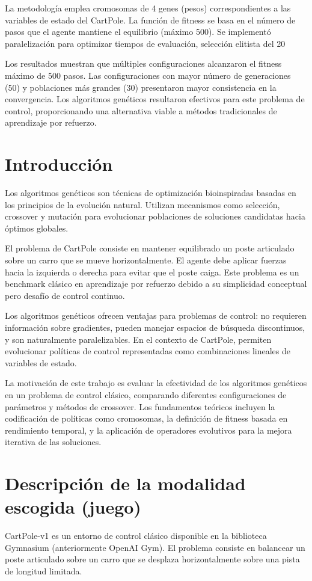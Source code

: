 \documentclass[12pt,a4paper]{article}
\begin{document}
La metodología emplea cromosomas de 4 genes (pesos) correspondientes a las variables de estado del CartPole. La función de fitness se basa en el número de pasos que el agente mantiene el equilibrio (máximo 500). Se implementó paralelización para optimizar tiempos de evaluación, selección elitista del 20%

Los resultados muestran que múltiples configuraciones alcanzaron el fitness máximo de 500 pasos. Las configuraciones con mayor número de generaciones (50) y poblaciones más grandes (30) presentaron mayor consistencia en la convergencia. Los algoritmos genéticos resultaron efectivos para este problema de control, proporcionando una alternativa viable a métodos tradicionales de aprendizaje por refuerzo.

\section{Introducción}

Los algoritmos genéticos son técnicas de optimización bioinspiradas basadas en los principios de la evolución natural. Utilizan mecanismos como selección, crossover y mutación para evolucionar poblaciones de soluciones candidatas hacia óptimos globales.

El problema de CartPole consiste en mantener equilibrado un poste articulado sobre un carro que se mueve horizontalmente. El agente debe aplicar fuerzas hacia la izquierda o derecha para evitar que el poste caiga. Este problema es un benchmark clásico en aprendizaje por refuerzo debido a su simplicidad conceptual pero desafío de control continuo.

Los algoritmos genéticos ofrecen ventajas para problemas de control: no requieren información sobre gradientes, pueden manejar espacios de búsqueda discontinuos, y son naturalmente paralelizables. En el contexto de CartPole, permiten evolucionar políticas de control representadas como combinaciones lineales de variables de estado.

La motivación de este trabajo es evaluar la efectividad de los algoritmos genéticos en un problema de control clásico, comparando diferentes configuraciones de parámetros y métodos de crossover. Los fundamentos teóricos incluyen la codificación de políticas como cromosomas, la definición de fitness basada en rendimiento temporal, y la aplicación de operadores evolutivos para la mejora iterativa de las soluciones.


\section{Descripción de la modalidad escogida (juego)}
CartPole-v1 es un entorno de control clásico disponible en la biblioteca Gymnasium (anteriormente OpenAI Gym). El problema consiste en balancear un poste articulado sobre un carro que se desplaza horizontalmente sobre una pista de longitud limitada.
\end{document}
